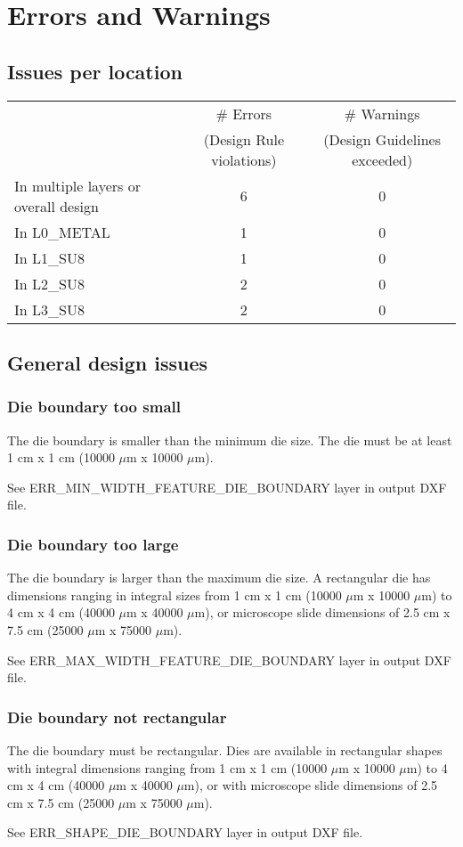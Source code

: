 \documentclass[twoside]{article}
\begin{document}
\section{Errors and Warnings}
\subsection{Issues per location}
\begin{tabular}{l|c|c}
 & \# Errors & \# Warnings \\
 & (Design Rule violations)& (Design Guidelines exceeded) \\ \hline
In multiple layers or overall design& 6& 0\\
In L0\_METAL& 1& 0\\
In L1\_SU8 & 1& 0\\
In L2\_SU8 & 2& 0\\
In L3\_SU8 & 2& 0\\
\end{tabular}

\subsection{General design issues}

\subsubsection{Die boundary too small}
\par The die boundary is smaller than the minimum die size. The die must be at
least 1 cm x 1 cm (10000 $\mu$m x 10000 $\mu$m).  \par See
ERR\_MIN\_WIDTH\_FEATURE\_DIE\_BOUNDARY layer in output DXF file.

\subsubsection{Die boundary too large}
\par The die boundary is larger than the maximum die size. A rectangular die has
dimensions ranging in integral sizes from 1 cm x 1 cm (10000 $\mu$m x 10000
$\mu$m) to 4 cm x 4 cm (40000 $\mu$m x 40000 $\mu$m), or microscope slide
dimensions of 2.5 cm x 7.5 cm (25000 $\mu$m x 75000 $\mu$m).  \par See
ERR\_MAX\_WIDTH\_FEATURE\_DIE\_BOUNDARY layer in output DXF file.

\subsubsection{Die boundary not rectangular}
\par The die boundary must be rectangular. Dies are available in rectangular
shapes with integral dimensions ranging from 1 cm x 1 cm (10000 $\mu$m x 10000
$\mu$m) to 4 cm x 4 cm (40000 $\mu$m x 40000 $\mu$m), or with microscope slide
dimensions of 2.5 cm x 7.5 cm (25000 $\mu$m x 75000 $\mu$m).  \par See
ERR\_SHAPE\_DIE\_BOUNDARY layer in output DXF file.
\end{document}
